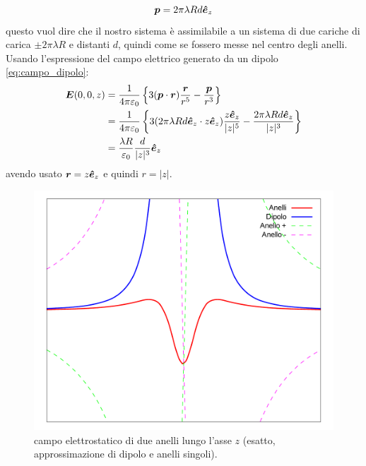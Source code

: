 \begin{Es}
  \[
    \boldsymbol{p} = 2\pi\lambda R d\boldsymbol{\hat {e}}_z
  \]
  questo vuol dire che il nostro sistema è assimilabile a un sistema di due cariche di carica $\pm 2\pi\lambda R $ e distanti $d$, quindi come se fossero messe nel centro degli anelli. Usando l'espressione del campo elettrico generato da un dipolo \eqref{eq:campo_dipolo}:
  \begin{align*}
    \boldsymbol{E}(0,0,z) & = \frac{1}{4\pi\varepsilon_0}\left\{3(\boldsymbol{p}\cdot\boldsymbol{r})\frac{\boldsymbol{r}}{r^5}-\frac{\boldsymbol{p}}{r^3}\right\}                                                  \\
                 & = \frac{1}{4\pi\varepsilon_0}\left\{3(2\pi\lambda R d\boldsymbol{\hat {e}}_z\cdot z\boldsymbol{\hat {e}}_z)\frac{z\boldsymbol{\hat {e}}_z}{|z|^5}-\frac{2\pi\lambda R d\boldsymbol{\hat {e}}_z}{|z|^3}\right\} \\
                 & = \frac{\lambda R}{\varepsilon_0}\frac{d}{|z|^3}\boldsymbol{\hat {e}}_z
  \end{align*}
  avendo usato $\boldsymbol{r}=z\boldsymbol{\hat {e}}_z$ e quindi $r = |z|$.
  \begin{figure}[htbp]
    \centering
    \includegraphics[scale=0.5]{immagini/fisica2/due_anelli}
    \caption{campo elettrostatico di due anelli lungo l'asse $z$ (esatto, approssimazione di dipolo e anelli singoli).}
  \end{figure}
\end{Es}
